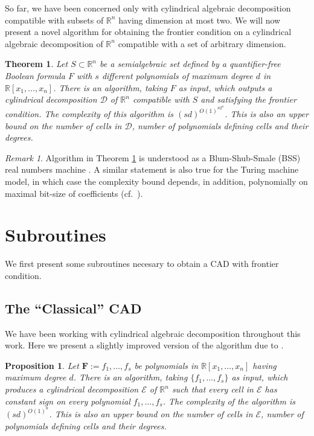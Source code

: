 \documentclass[
]{book}
\newtheorem{theorem}{Theorem}[chapter]
\newtheorem{proposition}{Proposition}[chapter]
\theoremstyle{definition}
\theoremstyle{definition}
\theoremstyle{definition}
\theoremstyle{definition}
\theoremstyle{remark}
\newtheorem*{remark}{Remark}
\begin{document}
So far, we have been concerned only with cylindrical algebraic decomposition compatible with subsets of \(\mathbb{R}^n\) having dimension at most two. We will now present a novel algorithm for obtaining the frontier condition on a cylindrical algebraic decomposition of \(\mathbb{R}^n\) compatible with a set of arbitrary dimension.

\begin{theorem}
\protect\hypertarget{thm:novel-frontier-main}{}\label{thm:novel-frontier-main}Let \(S \subset \mathbb{R}^n\) be a semialgebraic set defined by a quantifier-free Boolean formula \(F\) with \(s\) different polynomials of maximum degree \(d\) in \(\mathbb{R}[x_1,\ldots,x_n]\).
There is an algorithm, taking \(F\) as input, which outputs a cylindrical decomposition \(\mathcal D\) of \(\mathbb{R}^n\) compatible with \(S\) and
satisfying the frontier condition.
The complexity of this algorithm is \((sd)^{O(1)^{n2^n}}\).
This is also an upper bound on the number of cells in \(\mathcal D\), number of polynomials defining cells and their degrees.
\end{theorem}

\begin{remark}
Algorithm in Theorem \ref{thm:novel-frontier-main} is understood as a Blum-Shub-Smale (BSS) real numbers machine \citet{blum1998}.
A similar statement is also true for the Turing machine model, in which case the complexity bound
depends, in addition, polynomially on maximal bit-size of coefficients (cf.~\citet{collins1975}).
\end{remark}

\hypertarget{subroutines}{%
\section{Subroutines}\label{subroutines}}

We first present some subroutines necesary to obtain a CAD with frontier condition.

\hypertarget{the-classical-cad}{%
\subsection{The ``Classical'' CAD}\label{the-classical-cad}}

We have been working with cylindrical algebraic decomposition throughout this work. Here we present a slightly improved version of the algorithm due to \citet{bpr2006}.

\begin{proposition}
\protect\hypertarget{prp:novel-frontier-collins}{}\label{prp:novel-frontier-collins}\citep[Algorithm 11.2]{bpr2006}
Let \(\mathbf{F} := f_1,\ldots,f_s\) be polynomials in \(\mathbb{R}[x_1, \ldots ,x_n]\) having maximum degree \(d\).
There is an algorithm, taking \(\{f_1,\ldots,f_s\}\) as input, which produces a cylindrical decomposition \(\mathcal E\) of \(\mathbb{R}^n\) such that every cell in \(\mathcal{E}\) has constant sign on every polynomial \(f_1,\ldots,f_s\).
The complexity of the algorithm is \((sd)^{O(1)^{n}}\).
This is also an upper bound on the number of cells in \(\mathcal E\), number of polynomials defining cells and their degrees.
\end{proposition}
\end{document}
